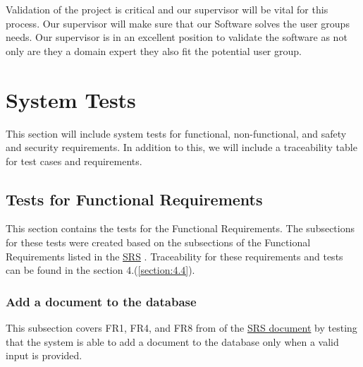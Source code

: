 \documentclass[12pt, titlepage]{article}
\begin{document}
Validation of the project is critical and our supervisor will be vital for this process. Our supervisor will make sure that our Software solves the user groups needs. Our supervisor is in an excellent position to validate the software as not only are they a domain expert they also fit the potential user group.

\section{System Tests} \label{section:4}

This section will include system tests for functional, non-functional, and safety and security requirements. In addition to this, we will include a traceability table for test cases and requirements.

\subsection{Tests for Functional Requirements} \label{section:4.1}



This section contains the tests for the Functional Requirements. The subsections for these tests were created based on the subsections of the Functional Requirements listed in the \href{https://github.com/Inreet-Kaur/capstone/blob/main/docs/SRS/SRS.pdf}{SRS} \citep{SRS}. Traceability for these requirements and tests can be found in the section 4.(\ref{section:4.4}).


\subsubsection{Add a document to the database} \label{section:4.1.1}

This subsection covers FR1, FR4, and FR8 from of the \href{https://github.com/Inreet-Kaur/capstone/blob/main/docs/SRS/SRS.pdf}{SRS document} \citep{SRS} by testing that the system is able to add a document to the database only when a valid input is provided.
\end{document}
